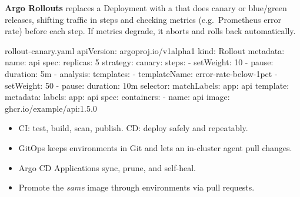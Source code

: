 \textbf{Argo Rollouts} replaces a Deployment with a  that does
canary or blue/green releases, shifting traffic in steps and checking metrics
(e.g.\ Prometheus error rate) before each step. If metrics degrade, it aborts
and rolls back automatically.

\begin{yamlcode}{rollout-canary.yaml}
apiVersion: argoproj.io/v1alpha1
kind: Rollout
metadata:
  name: api
spec:
  replicas: 5
  strategy:
    canary:
      steps:
        - setWeight: 10
        - pause: { duration: 5m }
        - analysis:
            templates:
              - templateName: error-rate-below-1pct
        - setWeight: 50
        - pause: { duration: 10m }
  selector:
    matchLabels: { app: api }
  template:
    metadata:
      labels: { app: api }
    spec:
      containers:
        - name: api
          image: ghcr.io/example/api:1.5.0
\end{yamlcode}

\begin{recap}
\begin{itemize}
  \item CI: test, build, scan, publish. CD: deploy safely and repeatably.
  \item GitOps keeps environments in Git and lets an in-cluster agent pull changes.
  \item Argo CD Applications sync, prune, and self-heal.
  \item Promote the \emph{same} image through environments via pull requests.
\end{itemize}
\end{recap}
